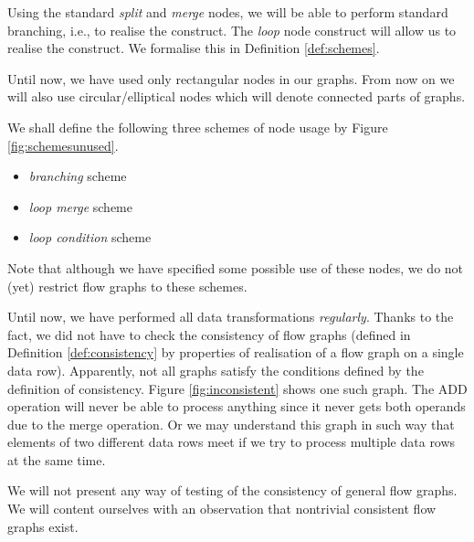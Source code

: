 Using the standard \emph{split} and \emph{merge} nodes, we will be able to perform standard branching, i.e., to realise the  construct. The \emph{loop} node construct will allow us to realise the  construct. We formalise this in Definition \ref{def:schemes}.

\begin{rem}
  Until now, we have used only rectangular nodes in our graphs. From now on we will also use circular/elliptical nodes which will denote connected parts of graphs.
\end{rem}

We shall define the following three schemes of node usage by Figure \ref{fig:schemesunused}.
\begin{itemize}
  \item \emph{branching} scheme
  \item \emph{loop merge} scheme
  \item \emph{loop condition} scheme
\end{itemize}
{}
\myenddef

\begin{rem}
  Note that although we have specified some possible use of these nodes, we do not (yet) restrict flow graphs to these schemes.
\end{rem}

Until now, we have performed all data transformations \emph{regularly}. Thanks to the fact, we did not have to check the consistency of flow graphs (defined in Definition \ref{def:consistency} by properties of realisation of a flow graph on a single data row).  Apparently, not all graphs satisfy the conditions defined by the definition of consistency. Figure \ref{fig:inconsistent} shows one such graph. The ADD operation will never be able to process anything since it never gets both operands due to the merge operation. Or we may understand this graph in such way that elements of two different data rows meet if we try to process multiple data rows at the same time.


We will not present any way of testing of the consistency of general flow graphs. We will content ourselves with an observation that nontrivial consistent flow graphs exist.

